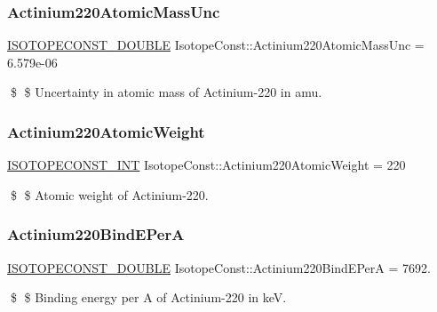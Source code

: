 \subsubsection{\texorpdfstring{Actinium220\+Atomic\+Mass\+Unc}{Actinium220AtomicMassUnc}}
{\footnotesize\ttfamily \mbox{\hyperlink{group___isotope_const-_macros_ga8f45a7272ce02c0b4c65c44636ed719a}{I\+S\+O\+T\+O\+P\+E\+C\+O\+N\+S\+T\+\_\+\+D\+O\+U\+B\+LE}} Isotope\+Const\+::\+Actinium220\+Atomic\+Mass\+Unc = 6.\+579e-\/06}

\$ \$ Uncertainty in atomic mass of Actinium-\/220 in amu. \mbox{\label{group___isotope_const-_actinium-_ac220_gaadd0d0be53c56ea08e1c4286dbb2d234}} 
\subsubsection{\texorpdfstring{Actinium220\+Atomic\+Weight}{Actinium220AtomicWeight}}
{\footnotesize\ttfamily \mbox{\hyperlink{group___isotope_const-_macros_ga5f18360b3e99483a35c32d789e62621c}{I\+S\+O\+T\+O\+P\+E\+C\+O\+N\+S\+T\+\_\+\+I\+NT}} Isotope\+Const\+::\+Actinium220\+Atomic\+Weight = 220}

\$ \$ Atomic weight of Actinium-\/220. \mbox{\label{group___isotope_const-_actinium-_ac220_ga491561722a4e40d53ae0b3ba73c9c068}} 
\subsubsection{\texorpdfstring{Actinium220\+Bind\+E\+PerA}{Actinium220BindEPerA}}
{\footnotesize\ttfamily \mbox{\hyperlink{group___isotope_const-_macros_ga8f45a7272ce02c0b4c65c44636ed719a}{I\+S\+O\+T\+O\+P\+E\+C\+O\+N\+S\+T\+\_\+\+D\+O\+U\+B\+LE}} Isotope\+Const\+::\+Actinium220\+Bind\+E\+PerA = 7692.}

\$ \$ Binding energy per A of Actinium-\/220 in keV. \mbox{\label{group___isotope_const-_actinium-_ac220_ga0be2545fe21fb472f5fe79a11b3ccc3b}} 
